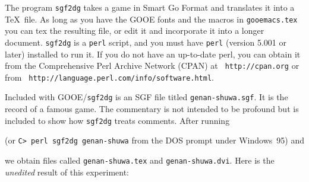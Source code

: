 The program {\tt sgf2dg} takes a game in Smart Go Format and
translates it into a \TeX\ file. As long as you have the GOOE
fonts and the macros in {\tt gooemacs.tex} you can tex the
resulting file, or edit it and incorporate it into a longer
document. {\tt sgf2dg} is a {\tt perl} script, and you must have
{\tt perl} (version 5.001 or later) installed to run it.  If you
do not have an up-to-date perl, you can obtain it from the
Comprehensive Perl Archive Network (CPAN) at {\tt
http://cpan.org} or from {\tt
http://language.perl.com/info/software.html}.

Included with GOOE/{\tt sgf2dg} is an SGF file titled
{\tt genan-shuwa.sgf}. It is the record of a famous game. The commentary
is not intended to be profound but is included to show how {\tt sgf2dg}
treats comments. After running 

\medbreak
{}
\medbreak\noindent
(or {\tt C> perl sgf2dg genan-shuwa} from the DOS prompt under Windows~95)
and

\medbreak
{}

\medbreak\noindent
we obtain files called {\tt genan-shuwa.tex} and {\tt genan-shuwa.dvi}. Here
is the {\it unedited} result of this experiment:

\vfil\eject
%
%

